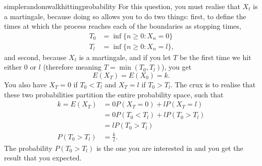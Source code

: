 \begin{answer}{simplerandomwalkhittingprobability}
For this question, you must realise that $X_t$ is a martingale, because doing so allows you to do two things: first, to define the times at which the process reaches each of the boundaries as stopping times,
\begin{align*}
  T_0 &= \inf\{ n \geq 0: X_n = 0\} \\
  T_l &= \inf\{ n \geq 0: X_n = l\}
  \text{,}
\end{align*}
and second, because $X_t$ is a martingale, and if you let $T$ be the first time we hit either $0$ or $l$ (therefore meaning $T = \min(T_0 , T_l)$), you get
\[
E(X_T) =  E(X_0) = k
\text{.}
\]
You also have
$X_T=0$ if $T_0 < T_l$
and
$X_T=l$ if $T_0 > T_l$.
The crux is to realise that these two probabilities partition the entire probability space, such that
\begin{align*}
k = E(X_T) &=  0 P(X_T =  0 ) + l P(X_T = l  ) \\
           &=  0 P(T_0 < T_l) + l P(T_0 > T_l) \\
           &=  l P(T_0 > T_l)  \\
P(T_0 > T_l) &= \frac{k}{l}
\text{.}
\end{align*}
The probability $P(T_0 > T_l)$ is the one you are interested in and you get the result that you expected.
\end{answer}

